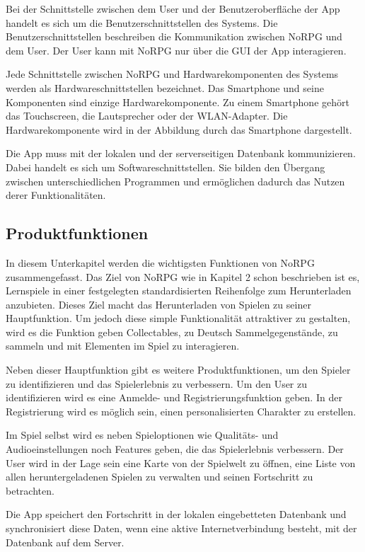 		Bei der Schnittstelle zwischen dem User und der Benutzeroberfläche der App handelt es sich um die Benutzerschnittstellen des Systems. Die Benutzerschnittstellen beschreiben die Kommunikation zwischen NoRPG und dem User. Der User kann mit NoRPG nur über die GUI der App interagieren.
		
		Jede Schnittstelle zwischen NoRPG und Hardwarekomponenten des Systems werden als Hardwareschnittstellen bezeichnet. Das Smartphone und seine Komponenten sind einzige Hardwarekomponente. Zu einem Smartphone gehört das Touchscreen, die Lautsprecher oder der WLAN-Adapter. Die Hardwarekomponente wird in der Abbildung durch das Smartphone dargestellt.
		
		Die App muss mit der lokalen und der serverseitigen Datenbank kommunizieren. Dabei handelt es sich um Softwareschnittstellen. Sie bilden den Übergang zwischen unterschiedlichen Programmen und ermöglichen dadurch das Nutzen derer Funktionalitäten. 

	\subsection{Produktfunktionen}
		In diesem Unterkapitel werden die wichtigsten Funktionen von NoRPG zusammengefasst. Das Ziel von NoRPG wie in Kapitel 2 schon beschrieben ist es, Lernspiele in einer festgelegten standardisierten Reihenfolge zum Herunterladen anzubieten. Dieses Ziel macht das Herunterladen von Spielen zu seiner Hauptfunktion. Um jedoch diese simple Funktionalität attraktiver zu gestalten, wird es die Funktion geben Collectables, zu Deutsch Sammelgegenstände, zu sammeln und mit Elementen im Spiel zu interagieren.
		
		Neben dieser Hauptfunktion gibt es weitere Produktfunktionen, um den Spieler zu identifizieren und das Spielerlebnis zu verbessern. Um den User zu identifizieren wird es eine Anmelde- und Registrierungsfunktion geben. In der Registrierung wird es möglich sein, einen personalisierten Charakter zu erstellen. 
		
		Im Spiel selbst wird es neben Spieloptionen wie Qualitäts- und Audioeinstellungen noch Features geben, die das Spielerlebnis verbessern. Der User wird in der Lage sein eine Karte von der Spielwelt zu öffnen, eine Liste von allen heruntergeladenen Spielen zu verwalten und seinen Fortschritt zu betrachten.
		
		Die App speichert den Fortschritt in der lokalen eingebetteten Datenbank und synchronisiert diese Daten, wenn eine aktive Internetverbindung besteht, mit der Datenbank auf dem Server.
	
